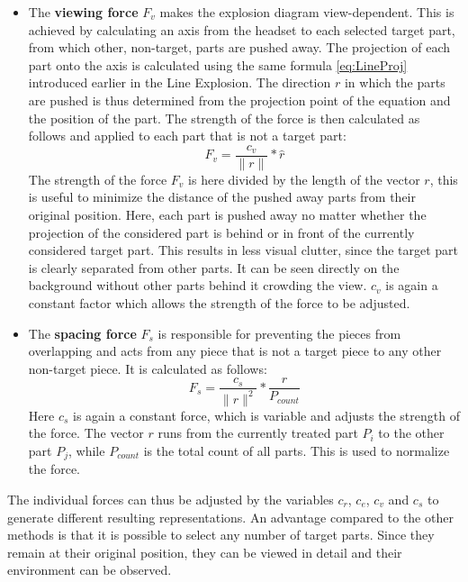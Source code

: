 \begin{itemize}
	\item The \textbf{viewing force} $F_v$ makes the explosion diagram view-dependent. 
	This is achieved by calculating an axis from the headset to each selected target part, from which other, non-target, parts are pushed away. 
	The projection of each part onto the axis is calculated using the same formula \ref{eq:LineProj} introduced earlier in the Line Explosion.
	The direction $r$ in which the parts are pushed is thus determined from the projection point of the equation and the position of the part. 
	The strength of the force is then calculated as follows and applied to each part that is not a target part:
	\begin{equation}
		F_v = \frac{c_v}{\|r\|} * \hat{r}
		\label{eq:FB_viewingForce}
	\end{equation}
	The strength of the force $F_v$ is here divided by the length of the vector $r$, this is useful to minimize the distance of the pushed away parts from their original position. 
	Here, each part is pushed away no matter whether the projection of the considered part is behind or in front of the currently considered target part. 
	This results in less visual clutter, since the target part is clearly separated from other parts. It can be seen directly on the background without other parts behind it crowding the view. 
	$c_v$ is again a constant factor which allows the strength of the force to be adjusted.
	\item The \textbf{spacing force} $F_s$ is responsible for preventing the pieces from overlapping and acts from any piece that is not a target piece to any other non-target piece. It is calculated as follows:
	\begin{equation}
	F_s = \frac{c_s}{\|r\|^2} * \frac{r}{P_{count}}
	\label{eq:FB_spacingForce}
	\end{equation}
	Here $c_s$ is again a constant force, which is variable and adjusts the strength of the force. 
	The vector $r$ runs from the currently treated part $P_i$ to the other part $P_j$, while $P_{count}$ is the total count of all parts. 
	This is used to normalize the force. 
\end{itemize}
The individual forces can thus be adjusted by the variables $c_r$, $c_e$, $c_v$ and $c_s$ to generate different resulting representations. 
An advantage compared to the other methods is that it is possible to select any number of target parts. Since they remain at their original position, they can be viewed in detail and their environment can be observed.   


